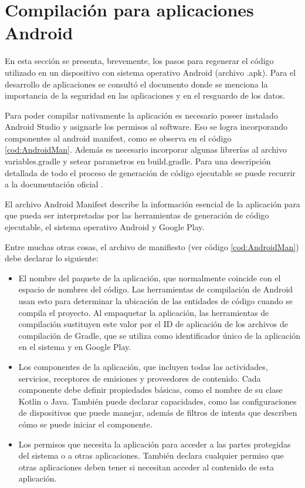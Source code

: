 
\chapter{Compilación para aplicaciones Android} %

\label{AppendixC} %

En esta sección se presenta, brevemente, los pasos para regenerar el código utilizado en un dispositivo con sistema operativo Android (archivo .apk). Para el desarrollo de aplicaciones se consultó el documento \citep{BOOK:3} donde se menciona la importancia de la seguridad en las aplicaciones y en el resguardo de los datos.

Para poder compilar nativamente la aplicación es necesario poseer instalado Android Studio \citep{WEBSITE:41} y asignarle los permisos al software. Eso se logra incorporando componentes al android manifest, como se observa en el código \ref{cod:AndroidMan}. Además es necesario incorporar algunas librerías al archivo variables.gradle y setear parametros en build.gradle. Para una descripción detallada de todo el proceso de generación de código ejecutable se puede recurrir a la documentación oficial \citep{WEBSITE:42}.

El archivo Android Manifest describe la información esencial de la aplicación para que pueda ser interpretadas por las herramientas de generación de código ejecutable, el sistema operativo Android y Google Play.

Entre muchas otras cosas, el archivo de manifiesto (ver código \ref{cod:AndroidMan}) debe declarar lo siguiente:
\begin{itemize}


\item El nombre del paquete de la aplicación, que normalmente coincide con el espacio de nombres del código. Las herramientas de compilación de Android usan esto para determinar la ubicación de las entidades de código cuando se compila el proyecto. Al empaquetar la aplicación, las herramientas de compilación sustituyen este valor por el ID de aplicación de los archivos de compilación de Gradle, que se utiliza como identificador único de la aplicación en el sistema y en Google Play. 
\item Los componentes de la aplicación, que incluyen todas las actividades, servicios, receptores de emisiones y proveedores de contenido. Cada componente debe definir propiedades básicas, como el nombre de su clase Kotlin o Java. También puede declarar capacidades, como las configuraciones de dispositivos que puede manejar, además de filtros de intents que describen cómo se puede iniciar el componente. 
\item Los permisos que necesita la aplicación para acceder a las partes protegidas del sistema o a otras aplicaciones. También declara cualquier permiso que otras aplicaciones deben tener si necesitan acceder al contenido de esta aplicación. 
\end{itemize}

